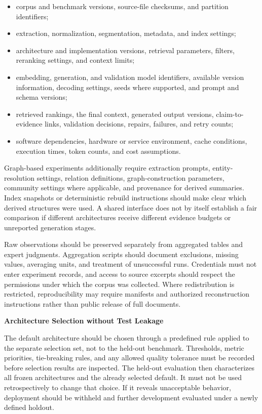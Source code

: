 \documentclass[12pt,a4paper]{report}
\numberwithin{equation}{chapter}
\begin{document}
\begin{itemize}
    \item corpus and benchmark versions, source-file checksums, and partition identifiers;
    \item extraction, normalization, segmentation, metadata, and index settings;
    \item architecture and implementation versions, retrieval parameters, filters, reranking settings, and context limits;
    \item embedding, generation, and validation model identifiers, available version information, decoding settings, seeds where supported, and prompt and schema versions;
    \item retrieved rankings, the final context, generated output versions, claim-to-evidence links, validation decisions, repairs, failures, and retry counts;
    \item software dependencies, hardware or service environment, cache conditions, execution times, token counts, and cost assumptions.
\end{itemize}

Graph-based experiments additionally require extraction prompts, entity-resolution settings, relation definitions, graph-construction parameters, community settings where applicable, and provenance for derived summaries. Index snapshots or deterministic rebuild instructions should make clear which derived structures were used. A shared interface does not by itself establish a fair comparison if different architectures receive different evidence budgets or unreported generation stages.

Raw observations should be preserved separately from aggregated tables and expert judgments. Aggregation scripts should document exclusions, missing values, averaging units, and treatment of unsuccessful runs. Credentials must not enter experiment records, and access to source excerpts should respect the permissions under which the corpus was collected. Where redistribution is restricted, reproducibility may require manifests and authorized reconstruction instructions rather than public release of full documents.

\par\medskip
\textbf{Architecture Selection without Test Leakage}

The default architecture should be chosen through a predefined rule applied to the separate selection set, not to the held-out benchmark. Thresholds, metric priorities, tie-breaking rules, and any allowed quality tolerance must be recorded before selection results are inspected. The held-out evaluation then characterizes all frozen architectures and the already selected default. It must not be used retrospectively to change that choice. If it reveals unacceptable behavior, deployment should be withheld and further development evaluated under a newly defined holdout.
\end{document}
